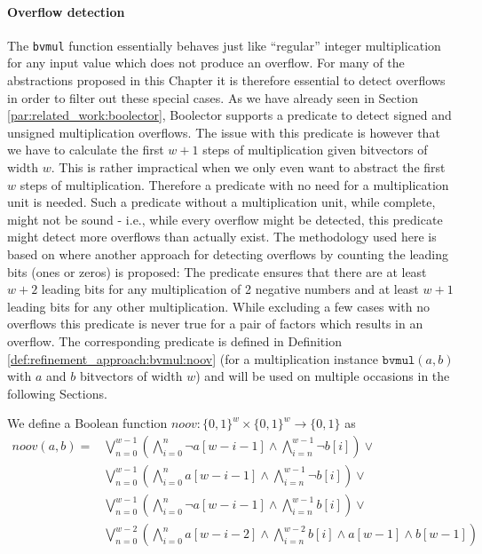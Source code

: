 \paragraph{Overflow detection}
The \texttt{bvmul} function essentially behaves just like \enquote{regular} integer multiplication for any input value
which does not produce an overflow.
For many of the abstractions proposed in this Chapter it is therefore essential to detect overflows in order to filter out these special cases.
As we have already seen in Section \ref{par:related_work:boolector}, Boolector supports a predicate to detect signed and unsigned multiplication overflows.
The issue with this predicate is however that we have to calculate the first $w+1$ steps of multiplication given bitvectors of width $w$.
This is rather impractical when we only even want to abstract the first $w$ steps of multiplication.
Therefore a predicate with no need for a multiplication unit is needed.
Such a predicate without a multiplication unit, while complete, might not be sound - i.e., while every overflow might be detected,
this predicate might detect more overflows than actually exist.
The methodology used here is based on \cite{Warren-HackersDelight} where another approach for detecting overflows by counting the leading bits (ones or zeros)
is proposed:
The predicate ensures that there are at least $w+2$ leading bits for any multiplication of 2 negative numbers and at least $w+1$ leading bits for any other multiplication.
While excluding a few cases with no overflows this predicate is never true for a pair of factors which results in an overflow.
The corresponding predicate is defined in Definition \ref{def:refinement_approach:bvmul:noov} (for a multiplication instance $\texttt{bvmul}\left(a,b\right)$ with $a$ and $b$ bitvectors of width $w$) and will be used on multiple occasions in the following Sections.
\begin{definition}
    We define a Boolean function $noov: \{0,1\}^w \times \{0,1\}^w \rightarrow \{0,1\}$ as
    \label{def:refinement_approach:bvmul:noov}
    \begin{align*}
        noov\left(a, b\right)
        = &\bigvee\limits_{n=0}^{w-1}
            \left(
            \bigwedge\limits_{i=0}^{n} \neg a[w-i-1]
            \land
            \bigwedge\limits_{i=n}^{w-1} \neg b[i]
            \right) \lor\\
            &\bigvee\limits_{n=0}^{w-1}
            \left(
            \bigwedge\limits_{i=0}^{n} a[w-i-1]
            \land
            \bigwedge\limits_{i=n}^{w-1} \neg b[i]
            \right) \lor\\
            &\bigvee\limits_{n=0}^{w-1}
            \left(
            \bigwedge\limits_{i=0}^{n} \neg a[w-i-1]
            \land
            \bigwedge\limits_{i=n}^{w-1} b[i]
            \right) \lor\\
            &\bigvee\limits_{n=0}^{w-2}
            \left(
            \bigwedge\limits_{i=0}^{n} a[w-i-2]
            \land
            \bigwedge\limits_{i=n}^{w-2} b[i]
            \land a[w-1]
            \land b[w-1]
            \right)
    \end{align*}
\end{definition}

